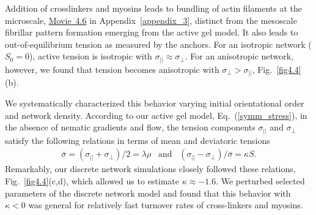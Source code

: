 Addition of crosslinkers and myosins leads to bundling of actin filaments at the microscale,  \href{https://github.com/waleedmirzaPhD/movies_thesis.git}{Movie~4.6} in Appendix~\ref{appendix_3}, distinct from the mesoscale fibrillar pattern formation emerging from the active gel model. It also leads to out-of-equilibrium tension as measured by the anchors. For an isotropic network ($S_0=0$), active tension is isotropic with $\sigma_{||}\approx\sigma_{\bot}$. For an anisotropic network, however, we found that tension becomes anisotropic with $\sigma_{\bot}>\sigma_{||}$, Fig.~\ref{fig4.4}(b). 

We systematically characterized this behavior varying initial orientational order and network density. According to our active gel model, Eq.~(\ref{symm_stress}), in the absence of nematic gradients and flow,  the tension components $\sigma_{||}$ and $\sigma_{\bot}$ satisfy the following relations in terms of mean and deviatoric tensions 
\begin{align}\label{mean_dev}
	\bar{\sigma} = (\sigma_{||}+\sigma_{\bot})/2 = \lambda \rho \;\;\;\mbox{and}\;\;\; (\sigma_{||}-\sigma_{\bot})/\bar{\sigma} = \kappa S.
\end{align}
Remarkably, our discrete network simulations closely followed these relations, Fig.~\ref{fig4.4}(c,d), which allowed us to estimate $\kappa \approx -1.6$. We perturbed selected parameters of the discrete network model and found that this behavior with $\kappa<0$ was general for relatively fast turnover rates of cross-linkers and myosins.

